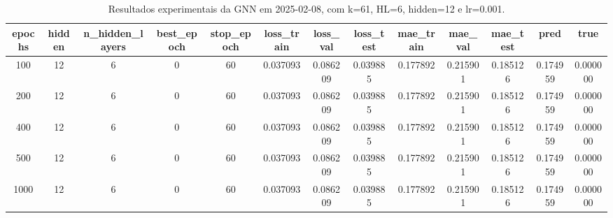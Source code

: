 \begin{table}[h]
\centering
\caption{Resultados experimentais da GNN em 2025-02-08, com k=61, HL=6, hidden=12 e lr=0.001.}
\label{tab:gnn_results_k61_hl6_h12_d20250208}
\begin{tabular}{ccccccccccccc}
\toprule
epochs & hidden & n\_hidden\_layers & best\_epoch & stop\_epoch & loss\_train & loss\_val & loss\_test & mae\_train & mae\_val & mae\_test & pred & true \\
\midrule
100 & 12 & 6 & 0 & 60 & 0.037093 & 0.086209 & 0.039885 & 0.177892 & 0.215901 & 0.185126 & 0.174959 & 0.000000 \\
200 & 12 & 6 & 0 & 60 & 0.037093 & 0.086209 & 0.039885 & 0.177892 & 0.215901 & 0.185126 & 0.174959 & 0.000000 \\
400 & 12 & 6 & 0 & 60 & 0.037093 & 0.086209 & 0.039885 & 0.177892 & 0.215901 & 0.185126 & 0.174959 & 0.000000 \\
500 & 12 & 6 & 0 & 60 & 0.037093 & 0.086209 & 0.039885 & 0.177892 & 0.215901 & 0.185126 & 0.174959 & 0.000000 \\
1000 & 12 & 6 & 0 & 60 & 0.037093 & 0.086209 & 0.039885 & 0.177892 & 0.215901 & 0.185126 & 0.174959 & 0.000000 \\
\bottomrule
\end{tabular}
\end{table}
